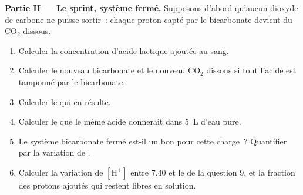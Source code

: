 \begin{problem}
\medskip
\noindent\textbf{Partie II --- Le sprint, système fermé.}
Supposons d'abord qu'aucun dioxyde de carbone ne puisse sortir~: chaque
proton capté par le bicarbonate devient du $\mathrm{CO_2}$ dissous.
\begin{enumerate}[resume]
  \item Calculer la concentration d'acide lactique ajoutée au sang.
  \item Calculer le nouveau bicarbonate et le nouveau $\mathrm{CO_2}$
        dissous si tout l'acide est tamponné par le bicarbonate.
  \item Calculer le  qui en résulte.
  \item Calculer le  que le même acide donnerait dans \qty{5}{L} d'eau
        pure.
  \item Le système bicarbonate fermé est-il un bon  pour cette
        charge~? Quantifier par la variation de .
  \item Calculer la variation de $[\mathrm{H^+}]$ entre  7.40 et le 
        de la question 9, et la fraction des protons ajoutés qui restent
        libres en solution.
\end{enumerate}


\end{problem}
